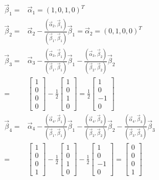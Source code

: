 \begin{align*}
\vec{\beta}_1=&\vec{\alpha}_1=(1,0,1,0)^T\\
\vec{\beta}_2=&\vec{\alpha}_2-\frac{(\vec{\alpha}_2,\vec{\beta}_1)}{(\vec{\beta}_1,\vec{\beta}_1)}\vec{\beta}_1
             =\vec{\alpha}_2=(0,1,0,0)^T\\
\vec{\beta}_3=&\vec{\alpha}_3-\frac{(\vec{\alpha}_3,\vec{\beta}_1)}{(\vec{\beta}_1,\vec{\beta}_1)}\vec{\beta}_1-
              \frac{(\vec{\alpha}_3,\vec{\beta}_2)}{(\vec{\beta}_2,\vec{\beta}_2)}\vec{\beta}_2\\
             =&\begin{bmatrix}1\\0\\0\\0\end{bmatrix}-\frac{1}{2}\begin{bmatrix}1\\0\\1\\0\end{bmatrix}
             =\frac{1}{2}\begin{bmatrix}1\\0\\-1\\0\end{bmatrix}\\
\vec{\beta}_4=&\vec{\alpha}_4-\frac{(\vec{\alpha}_4,\vec{\beta}_1)}{(\vec{\beta}_1,\vec{\beta}_1)}\vec{\beta}_1-
               \frac{(\vec{\alpha}_4,\vec{\beta}_2)}{(\vec{\beta}_2,\vec{\beta}_2)}\vec{\beta}_2
                -\frac{(\vec{\alpha}_4,\vec{\beta}_3)}{(\vec{\beta}_3,\vec{\beta}_3)}\vec{\beta}_3\\
             =&\begin{bmatrix}1\\0\\0\\1\end{bmatrix}-\frac{1}{2}\begin{bmatrix}1\\0\\1\\0\end{bmatrix}-
                \frac{1}{2}\begin{bmatrix}1\\0\\-1\\0\end{bmatrix}
              =\begin{bmatrix}0\\0\\0\\1\end{bmatrix}
\end{align*}
